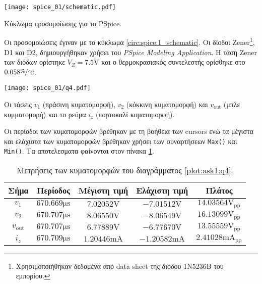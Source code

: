 \begin{center}
	\begin{circuitfig}[H]
		\texttt{[image: spice\_01/schematic.pdf]}
		\caption{Κύκλωμα προσομοίωσης για το PSpice.}
		\label{circ:spice:1_schematic}
	\end{circuitfig}
\end{center}
\vspace*{-10pt}

Οι προσομοιώσεις έγιναν με το κύκλωμα \ref{circ:spice:1_schematic}. Οι δίοδοι Zener\footnote{Χρησιμοποιήθηκαν δεδομένα από data sheet της διόδου 1N5236B του εμπορίου.}, D1 και D2, δημιουργήθηκαν χρήσει του \textsl{PSpice Modeling Application}. Η τάση Zener των διόδων ορίστηκε $V_Z=7.5\unit{\volt}$ και ο θερμοκρασιακός συντελεστής ορίσθηκε στο $0.058\displaystyle{\sfrac{\%}{\unit{\celsius}}}$.

\begin{plot_fig}[H]
	\begin{center}
		\texttt{[image: spice\_01/q4.pdf]}
		\caption{Οι τάσεις $v_1$ (πράσινη κυματομορφή), $v_2$ (κόκκινη κυματομορφή) και $v_{\mathrm{out}}$ (μπλε κυμματομορή) και το ρεύμα $i_z$ (πορτοκαλί κυματομορφή).}
		\label{plot:ask1:q4}
	\end{center}
\end{plot_fig}

Οι περίοδοι των κυματομορφών βρέθηκαν με τη βοήθεια των cursors ενώ τα μέγιστα και ελάχιστα των κυματομορφών βρέθηκαν χρήσει των συναρτήσεων \texttt{Max()} και \texttt{Min()}. Τα αποτελεσματα φαίνονται στον πίνακα \ref{table:ask1:q4:periods}.

\begin{table}[h]
	\begin{center}
		\begin{tabular}{|c|c|c|c|c|}
			\hline
			\textbf{Σήμα}      & \textbf{Περίοδος}             & \textbf{Μέγιστη τιμή}         & \textbf{Ελάχιστη τιμή}         & \textbf{Πλάτος}                       \\
			\hline
			\hline
			$v_1$              & $670.669\unit{\micro\second}$ & $7.02052\unit{\volt}$         & $-7.01512\unit{\volt}$         & $14.03564\unit{\volt}_{\mathrm{pp}}$         \\\hline
			$v_2$              & $670.707\unit{\micro\second}$ & $8.06550\unit{\volt}$         & $-8.06549\unit{\volt}$         & $16.13099\unit{\volt}_{\mathrm{pp}}$         \\\hline
			$v_{\mathrm{out}}$ & $670.707\unit{\micro\second}$ & $6.77889\unit{\volt}$         & $-6.77670\unit{\volt}$         & $13.55559\unit{\volt}_{\mathrm{pp}}$         \\\hline
			$i_z$              & $670.709\unit{\micro\second}$ & $1.20446\unit{\milli\ampere}$ & $-1.20582\unit{\milli\ampere}$ & $2.41028\unit{\milli\ampere}_{\mathrm{pp}}$ \\\hline
		\end{tabular}
		\caption{Μετρήσεις των κυματομορφών του διαγράμματος \ref{plot:ask1:q4}.}
		\label{table:ask1:q4:periods}
	\end{center}
\end{table}
